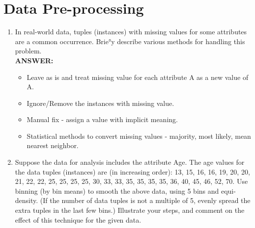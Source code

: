 \documentclass{article}
\begin{document}
\section{Data Pre-processing}
\begin{enumerate}
\item In real-world data, tuples (instances) with missing values for
  some attributes are a common occurrence. Brie°y describe various
  methods for handling this problem. \\

\textbf{ANSWER:} 
\begin{itemize}
\item Leave as is and treat missing value for each attribute A as a new
  value of A. 
\item Ignore/Remove the instances with missing value. 
\item Manual fix - assign a value with implicit meaning. 
\item Statistical methods to convert missing values - majority, most
  likely, mean nearest neighbor.
\end{itemize}

\item Suppose the data for analysis includes the attribute Age. The age
values for the data tuples (instances) are (in increasing order): 13,
15, 16, 16, 19, 20, 20, 21, 22, 22, 25, 25, 25, 25, 30, 33, 33, 35, 35,
35, 35, 36, 40, 45, 46, 52, 70. Use binning (by bin means) to smooth the
above data, using 5 bins and equi-density. (If the number of data tuples
is not a multiple of 5, evenly spread the extra tuples in the last few
bins.) Illustrate your steps, and comment on the effect of this technique
for the given data. \\


\end{enumerate}
\end{document}
